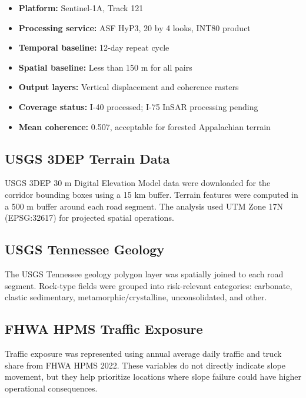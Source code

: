 \documentclass[11pt,letterpaper]{article}
\begin{document}
\begin{boxednote}
\begin{itemize}
  \item \textbf{Platform:} Sentinel-1A, Track 121
  \item \textbf{Processing service:} ASF HyP3, 20 by 4 looks, INT80 product
  \item \textbf{Temporal baseline:} 12-day repeat cycle
  \item \textbf{Spatial baseline:} Less than 150 m for all pairs
  \item \textbf{Output layers:} Vertical displacement and coherence rasters
  \item \textbf{Coverage status:} I-40 processed; I-75 InSAR processing pending
  \item \textbf{Mean coherence:} 0.507, acceptable for forested Appalachian terrain
\end{itemize}
\end{boxednote}

\subsection{USGS 3DEP Terrain Data}

USGS 3DEP 30 m Digital Elevation Model data were downloaded for the corridor bounding boxes using a 15 km buffer. Terrain features were computed in a 500 m buffer around each road segment. The analysis used UTM Zone 17N (EPSG:32617) for projected spatial operations.

\subsection{USGS Tennessee Geology}

The USGS Tennessee geology polygon layer was spatially joined to each road segment. Rock-type fields were grouped into risk-relevant categories: carbonate, clastic sedimentary, metamorphic/crystalline, unconsolidated, and other.

\subsection{FHWA HPMS Traffic Exposure}

Traffic exposure was represented using annual average daily traffic and truck share from FHWA HPMS 2022. These variables do not directly indicate slope movement, but they help prioritize locations where slope failure could have higher operational consequences.
\end{document}
